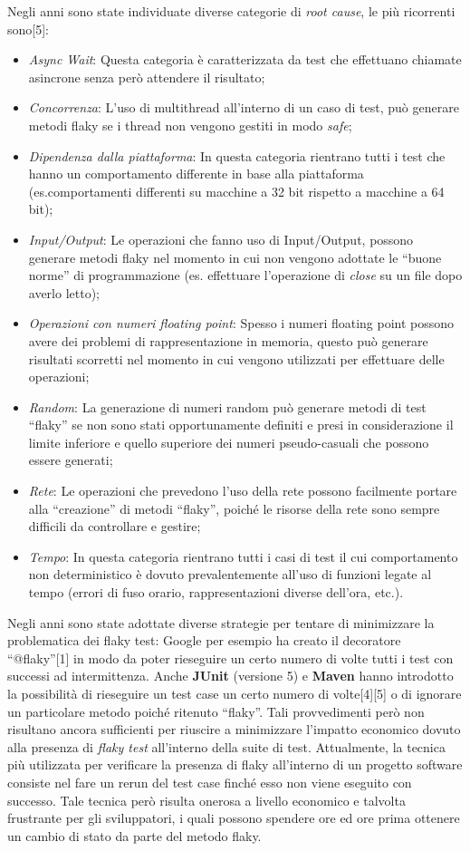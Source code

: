 Negli anni sono state individuate diverse categorie di \emph{root cause}, le più ricorrenti sono[5]:
\begin{itemize}
	\item \emph{Async Wait}: Questa categoria è caratterizzata da test che effettuano chiamate
	asincrone senza però attendere il risultato;
	\item \emph{Concorrenza}: L’uso di multithread all’interno di un caso di test, può
	generare metodi flaky se i thread non vengono gestiti in modo \emph{safe};
	\item \emph{Dipendenza dalla piattaforma}: In questa categoria rientrano tutti i test che
	hanno un comportamento differente in base alla piattaforma (es.comportamenti differenti su macchine a 32 bit rispetto a macchine a 64 bit);
	\item \emph{Input/Output}: Le operazioni che fanno uso di Input/Output, possono generare metodi flaky nel momento in cui non vengono adottate le “buone norme” di programmazione (es. effettuare l’operazione di \emph{close} su un file dopo averlo letto);
	\item \emph{Operazioni con numeri floating point}: Spesso i numeri floating point possono avere dei problemi di rappresentazione in memoria, questo può
	generare risultati scorretti nel momento in cui vengono utilizzati per effettuare delle operazioni;
	\item \emph{Random}: La generazione di numeri random può generare metodi di test
	“flaky” se non sono stati opportunamente definiti e presi in considerazione il limite inferiore e quello superiore dei numeri pseudo-casuali che possono essere generati;
	\item \emph{Rete}: Le operazioni che prevedono l’uso della rete possono facilmente portare alla “creazione” di metodi “flaky”, poiché le risorse della rete sono sempre difficili da controllare e gestire;
	\item \emph{Tempo}: In questa categoria rientrano tutti i casi di test il cui comportamento non deterministico è dovuto prevalentemente all’uso di funzioni legate al
	tempo (errori di fuso orario, rappresentazioni diverse dell’ora, etc.).
\end{itemize}

Negli anni sono state adottate diverse strategie per tentare di minimizzare la problematica dei flaky test: Google per esempio ha creato il decoratore “@flaky”[1]
in modo da poter rieseguire un certo numero di volte tutti i test con successi ad intermittenza. Anche \textbf{JUnit} (versione 5) e \textbf{Maven} hanno introdotto la possibilità di rieseguire un test case un certo numero di volte[4][5] o di ignorare un particolare
metodo poiché ritenuto “flaky”. Tali provvedimenti però non risultano ancora sufficienti per riuscire a minimizzare l’impatto economico dovuto alla presenza di \emph{flaky test} all’interno della suite di test. Attualmente, la tecnica più utilizzata per verificare la presenza di flaky all’interno di un progetto software consiste nel fare un rerun del test case finché esso non viene eseguito con successo. Tale tecnica però
risulta onerosa a livello economico e talvolta frustrante per gli sviluppatori, i quali possono spendere ore ed ore prima ottenere un cambio di stato da parte del metodo flaky.
